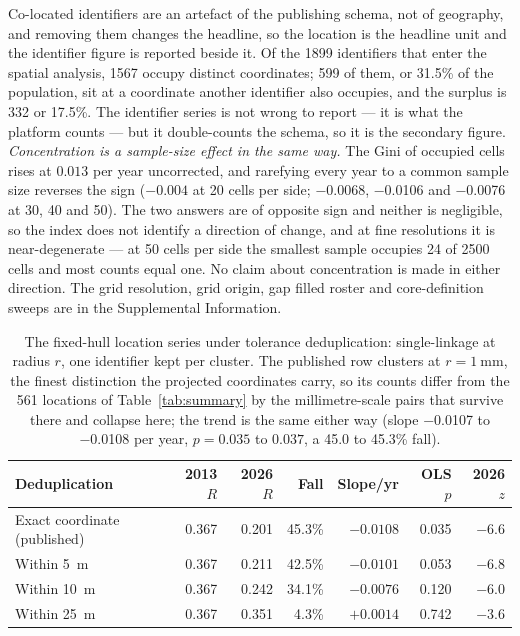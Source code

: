 \documentclass[fleqn,10pt,lineno]{wlpeerj}
\newcommand{\giniRareSlope}{-0.004}
\newcommand{\giniRawSlope}{0.013}
\newcommand{\nAnalysed}{1899}
\newcommand{\nLocations}{1567}
\newcommand{\nShared}{599}
\newcommand{\nSurplus}{332}
\newcommand{\sharePct}{31.5}
\newcommand{\surplusPct}{17.5}
\begin{document}
Co-located identifiers are an artefact of the publishing schema, not of geography, and
removing them changes the headline, so the location is the headline unit and the identifier
figure is reported beside it. Of the \nAnalysed{} identifiers that enter the spatial analysis,
\nLocations{} occupy distinct coordinates; \nShared{} of them, or \sharePct\% of the population,
sit at a coordinate another identifier also occupies, and the surplus is \nSurplus{} or
\surplusPct\%. The identifier series is not wrong to report --- it is what the platform counts
--- but it double-counts the schema, so it is the secondary figure. \emph{Concentration is a
sample-size effect in the same way.} The Gini of occupied cells rises at $\giniRawSlope$ per
year uncorrected, and rarefying every year to a common sample size reverses the sign
($\giniRareSlope$ at 20 cells per side; \num{-0.0068}, \num{-0.0106} and \num{-0.0076} at 30,
40 and 50). The two answers are of opposite sign and neither is negligible, so the index does
not identify a direction of change, and at fine resolutions it is near-degenerate --- at 50
cells per side the smallest sample occupies 24 of 2500 cells and most counts equal one. No
claim about concentration is made in either direction. The grid resolution, grid origin, gap
filled roster and core-definition sweeps are in the Supplemental Information.

\begin{table}[htbp]
\centering
\caption{The fixed-hull location series under tolerance deduplication: single-linkage at radius $r$, one identifier kept per cluster. The published row clusters at $r = \SI{1}{\milli\meter}$, the finest distinction the projected coordinates carry, so its counts differ from the \num{561} locations of Table~\ref{tab:summary} by the millimetre-scale pairs that survive there and collapse here; the trend is the same either way (slope \num{-0.0107} to \num{-0.0108} per year, $p = 0.035$ to $0.037$, a \num{45.0} to \num{45.3}\% fall).}
\label{tab:neardup}
\footnotesize
\setlength{\tabcolsep}{5pt}
\begin{tabular}{lrrrrrr}
\toprule
Deduplication & 2013 $R$ & 2026 $R$ & Fall & Slope/yr & OLS $p$ & 2026 $z$ \\
\midrule
Exact coordinate (published) & 0.367 & 0.201 & 45.3\% & $-0.0108$ & 0.035 & $-6.6$ \\
Within \SI{5}{\meter}         & 0.367 & 0.211 & 42.5\% & $-0.0101$ & 0.053 & $-6.8$ \\
Within \SI{10}{\meter}        & 0.367 & 0.242 & 34.1\% & $-0.0076$ & 0.120 & $-6.0$ \\
Within \SI{25}{\meter}        & 0.367 & 0.351 & 4.3\%  & $+0.0014$ & 0.742 & $-3.6$ \\
\bottomrule
\end{tabular}
\end{table}
\end{document}
